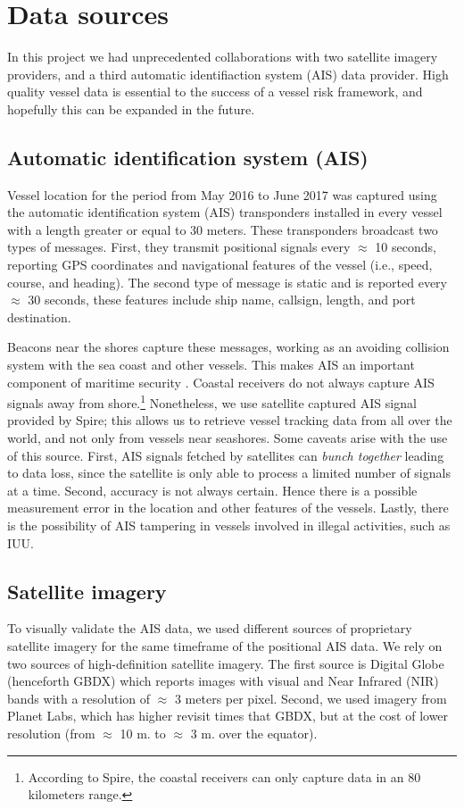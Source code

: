 \section{Data sources}
In this project we had unprecedented collaborations with two satellite imagery providers, and a third automatic identifiaction system (AIS) data provider. High quality vessel data is essential to the success of a vessel risk framework, and hopefully this can be expanded in the future.

\subsection{Automatic identification system (AIS)}
Vessel location for the period from May 2016 to June 2017 was captured using the automatic identification system (AIS) transponders installed in every vessel with a length greater or equal to 30 meters. These transponders broadcast two types of messages. First, they transmit positional signals every $\approx$ 10 seconds, reporting GPS coordinates and navigational features of the vessel (i.e., speed, course, and heading). The second type of message is static and is reported every $\approx$ 30 seconds, these features include ship name, callsign, length, and port destination. 

Beacons near the shores capture these messages, working as an avoiding collision system with the sea coast and other vessels. This makes AIS an important component of maritime security \cite{Tetreault2005}. Coastal receivers do not always capture AIS signals away from shore.\footnote{According to Spire, the coastal receivers can only capture data in an 80 kilometers range.} Nonetheless, we use satellite captured AIS signal provided by Spire; this allows us to retrieve vessel tracking data from all over the world, and not only from vessels near seashores. Some caveats arise with the use of this source. First, AIS signals fetched by satellites can \textit{bunch together} leading to data loss, since the satellite is only able to process a limited number of signals at a time. Second, accuracy is not always certain. Hence there is a possible measurement error in the location and other features of the vessels. Lastly, there is the possibility of AIS tampering in vessels involved in illegal activities, such as IUU. 

\subsection{Satellite imagery}
To visually validate the AIS data, we used different sources of proprietary satellite imagery for the same timeframe of the positional AIS data. We rely on two sources of high-definition satellite imagery. The first source is Digital Globe (henceforth GBDX) which reports images with visual and Near Infrared (NIR) bands with a resolution of $\approx$ 3 meters per pixel. Second, we used imagery from Planet Labs, which has higher revisit times that GBDX, but at the cost of lower resolution (from $\approx$ 10 m. to $\approx$ 3 m. over the equator). 

